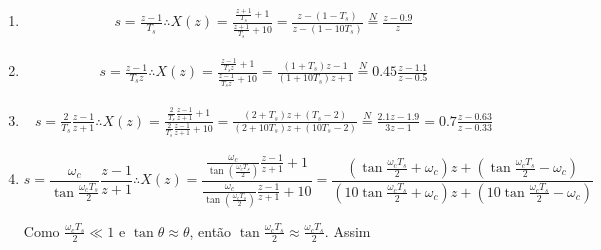 \documentclass[twoside, fleqn]{article}
\begin{document}
    \begin{enumerate}
        \item %
            \begin{equation}
                \begin{split}
                    s = \frac{z - 1}{T_s} \therefore X(z) = \frac{\frac{z+1}{T_s} + 1}{\frac{z+1}{T_s} + 10} = \frac{z - (1-T_s)}{z - (1-10T_s)} \stackrel{N}{=} \frac{z - 0.9}{z} 
                \end{split}
            \end{equation}
        
        \item %
            \begin{equation}
                \begin{split}
                    s = \frac{z - 1}{T_s z} \therefore X(z) = \frac{\frac{z-1}{T_s z} + 1}{\frac{z-1}{T_s z} + 10} = \frac{(1+T_s) z - 1}{(1 + 10T_s) z + 1} \stackrel{N}{=} 0.45 \frac{z - 1.1}{z - 0.5}
                \end{split}
            \end{equation}
        
        \item %
            \begin{equation}
                \begin{split}
                    s = \frac{2}{T_s} \frac{z - 1}{z+1} \therefore X(z) = \frac{\frac{2}{T_s} \frac{z-1}{z+1} + 1}{\frac{2}{T_s} \frac{z-1}{z+1} + 10} = \frac{(2+T_s)z + (T_s - 2)}{(2 + 10T_s) z + (10 T_s - 2)} \stackrel{N}{=} \frac{2.1z - 1.9}{3z - 1} = 0.7\frac{z-0.63}{z-0.33}
                \end{split}
            \end{equation}
        
        \item %
        \label{item:ex5d}
            \begin{equation}
                s = \frac{\omega_c}{\tan{\frac{\omega_c T_s}{2}}} \frac{z-1}{z+1} \therefore X(z) = \frac{\frac{\omega_c}{\tan(\frac{\omega_c T_s}{2})} \frac{z-1}{z+1} + 1}{\frac{\omega_c}{\tan(\frac{\omega_c T_s}{2})} \frac{z-1}{z+1} + 10} = \frac{(\tan{\frac{\omega_c T_s}{2}} + \omega_c) z + (\tan{\frac{\omega_c T_s}{2}} - \omega_c)}{(10 \tan{\frac{\omega_c T_s}{2}} + \omega_c) z + (10 \tan{\frac{\omega_c T_s}{2}} - \omega_c)} 
            \end{equation}
            
        Como $\frac{\omega_c T_s}{2} \ll 1$ e $\tan{\theta} \approx \theta$, então $\tan{\frac{\omega_c T_s}{2}} \approx \frac{\omega_c T_s}{2}$. Assim
        

\end{enumerate}
\end{document}
